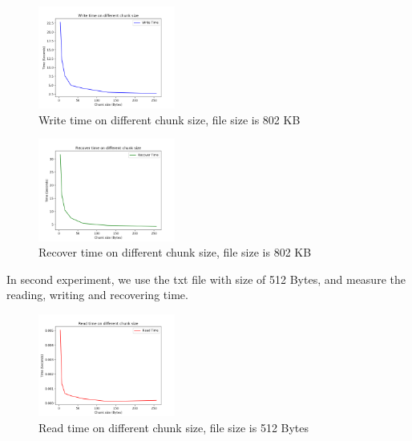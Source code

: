 \documentclass[journal]{IEEEtran}
\begin{document}
\begin{figure}[htbp]

	\centering

	\captionsetup{justification=centering}

	\includegraphics[width=0.4\textwidth]{fig/result_write.png}

	\caption{Write time on different chunk size, file size is 802 KB}

\end{figure}


\begin{figure}[]

	\centering

	\captionsetup{justification=centering}

	\includegraphics[width=0.4\textwidth]{fig/result_recover.png}

	\caption{Recover time on different chunk size, file size is 802 KB}

\end{figure}


In second experiment, we use the txt file with size of 512 Bytes, and measure the reading, writing and recovering time.


\begin{figure}[H]

	\centering

	\captionsetup{justification=centering}

	\includegraphics[width=0.4\textwidth]{fig/result_read_small.png}

	\caption{Read time on different chunk size, file size is 512 Bytes}

\end{figure}
\end{document}
